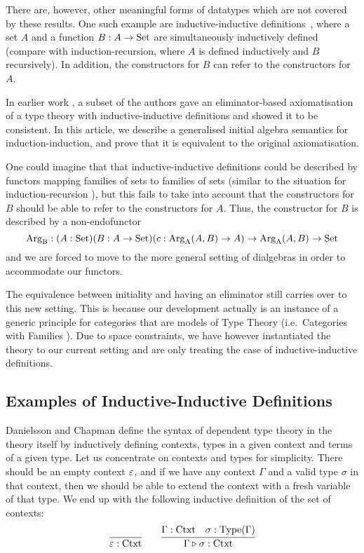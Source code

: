 \documentclass[orivec,envcountsame, ,envcountsect]{llncs}
\begin{document}
There are, however, other meaningful forms of datatypes which are not
covered by these results. One such example are inductive-inductive
definitions~\cite{nordvallforsbergSetzer2010indind}, where a set $A$
and a function $B : A \to \text{Set}$ are simultaneously inductively defined
(compare with induction-recursion, where $A$ is defined inductively
and $B$ recursively). In addition, the constructors for $B$ can refer
to the constructors for $A$.

In earlier work \cite{nordvallforsbergSetzer2010indind}, a subset of
the authors gave an eliminator-based axiomatisation of a type theory
with inductive-inductive definitions and showed it to be
consistent. In this article, we describe a generalised initial algebra
semantics for induction-induction, and prove that it is equivalent to
the original axiomatisation.

One could imagine that that inductive-inductive definitions could be
described by functors mapping families of sets to families of sets
(similar to the situation for induction-recursion
\cite{dybjersetzer2003inalg}), but this fails to take into account
that the constructors for $B$ should be able to refer to the
constructors for $A$. Thus, the constructor for $B$ is described by a
non-endofunctor
\[
\text{Arg}_{\text{B}} : (A : \text{Set})(B : A \to \text{Set})(c : \text{Arg}_{\text{A}}(A, B) \to A) \to \text{Arg}_{\text{A}}(A, B) \to \text{Set}
\]
and we are forced to move to the more general setting of dialgebras
\cite{hagino1987phdthesis,pollZwanenburg2001dialgebra}
in order to accommodate our functors. 

The equivalence between initiality and having an eliminator still
carries over to this new setting. This is because our development
actually is an instance of a generic principle for categories that are
models of Type Theory (i.e.\ Categories with Families
\cite{dybjer1996internalTT,hofmann1997syntaxsemantics}). Due to space
constraints, we have however instantiated the theory to our current
setting and are only treating the case of inductive-inductive
definitions.


\subsection{Examples of Inductive-Inductive Definitions}
\label{sec:ex-indind}

Danielsson \cite{danielsson2007formalisation} and Chapman
\cite{chapman2009eatitself} define the syntax of dependent type theory
in the theory itself by inductively defining contexts, types in a
given context and terms of a given type. Let us concentrate on
contexts and types for simplicity. There should be an empty
context $\varepsilon$, and if we have any context $\Gamma$ and a valid
type $\sigma$ in that context, then we should be able to extend the
context with a fresh variable of that type. We end up with the
following inductive definition of the set of contexts:
\[
\infer{\emptyCtxt : \Ctxt}{} \qquad
\infer{\consCtxt{\Gamma}{\sigma} : \Ctxt}{\Gamma : \Ctxt & \sigma : \Type(\Gamma)}
\]
\end{document}
